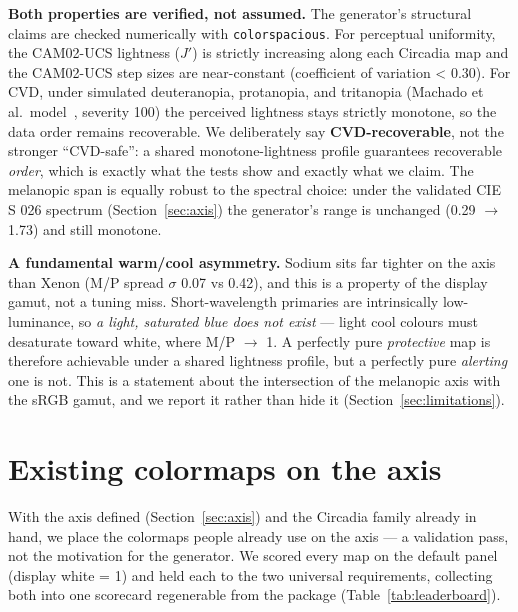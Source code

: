 \documentclass[10pt,a4paper,twocolumn]{article}
\begin{document}
\par
\textbf{Both properties are verified, not assumed.}
The generator's structural claims are checked numerically with \texttt{colorspacious}.
For perceptual uniformity, the CAM02-UCS lightness ($J'$) is strictly increasing along each Circadia map and the CAM02-UCS step sizes are near-constant (coefficient of variation < 0.30).
For CVD, under simulated deuteranopia, protanopia, and tritanopia (Machado et al.\ model~\cite{machado2009cvd}, severity 100) the perceived lightness stays strictly monotone, so the data order remains recoverable.
We deliberately say \textbf{CVD-recoverable}, not the stronger ``CVD-safe'': a shared monotone-lightness profile guarantees recoverable \emph{order}, which is exactly what the tests show and exactly what we claim.
The melanopic span is equally robust to the spectral choice: under the validated CIE S 026 spectrum (Section~\ref{sec:axis}) the generator's range is unchanged (0.29 $\rightarrow$ 1.73) and still monotone.

\par
\textbf{A fundamental warm/cool asymmetry.}
Sodium sits far tighter on the axis than Xenon (M/P spread $\sigma$ 0.07 vs 0.42), and this is a property of the display gamut, not a tuning miss.
Short-wavelength primaries are intrinsically low-luminance, so \emph{a light, saturated blue does not exist} --- light cool colours must desaturate toward white, where M/P $\rightarrow$ 1.
A perfectly pure \emph{protective} map is therefore achievable under a shared lightness profile, but a perfectly pure \emph{alerting} one is not.
This is a statement about the intersection of the melanopic axis with the sRGB gamut, and we report it rather than hide it (Section~\ref{sec:limitations}).

\section{Existing colormaps on the axis}\label{sec:existing-colormaps}

With the axis defined (Section~\ref{sec:axis}) and the Circadia family already in hand, we place the colormaps people already use on the axis --- a validation pass, not the motivation for the generator.
We scored every map on the default panel (display white = 1) and held each to the two universal requirements, collecting both into one scorecard regenerable from the package (Table~\ref{tab:leaderboard}).
\end{document}
